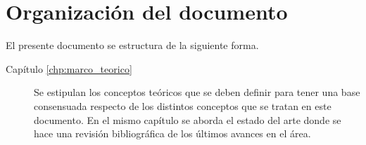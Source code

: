 \section{Organización del documento}
\label{sec:organizacion}
El presente documento se estructura de la siguiente forma.

\begin{description}
	\item [Capítulo \ref{chp:marco_teorico}] Se estipulan los conceptos teóricos que se deben definir para tener una base consensuada respecto de los distintos conceptos que se tratan en este documento. En el mismo capítulo se aborda el estado del arte donde se hace una revisión bibliográfica de los últimos avances en el área.
	
\end{description}